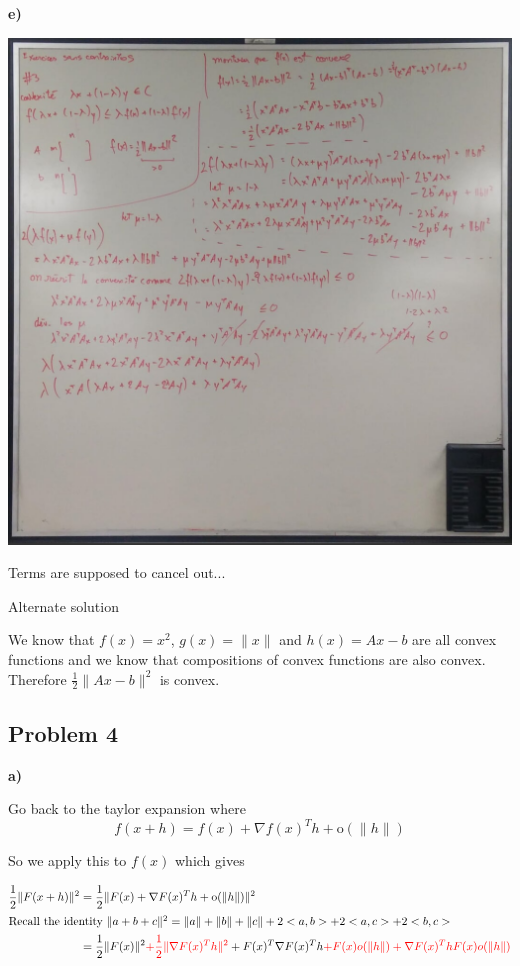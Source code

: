 \textbf{e)}

\answer
\begin{center}
\includegraphics[width=0.75\linewidth]{fig/unconstrained_exercices/pb3_e.png}
\end{center}

Terms are supposed to cancel out... 

\incomplete

\color{red}
Alternate solution

We know that $f(x) = x^2$, $g(x) = \|x\|$ and $h(x) = Ax-b$ are all convex functions and we know that compositions of convex functions are also convex. Therefore $\frac{1}{2} \| Ax-b\|^2$ is convex.

\color{black}

\subsection{Problem 4}

\textbf{a)}

\answer

Go back to the taylor expansion where
\[
	f(x+h) = f(x) + \nabla f(x)^Th + \text{o}(\| h\|)
\]

So we apply this to $f(x)$ which gives

\begin{align*}
	\frac{1}{2} \| F(x+h) \|^2 &= \frac{1}{2} \| F(x) + \nabla F(x)^Th + \text{o}(\| h\|) \|^2 \\
\intertext{Recall the identity $\| a + b + c\|^2 = \|a\| + \|b\| + \|c\| + 2<a,b> + 2<a,c> + 2<b,c>$}
	&= \frac{1}{2} \|  F(x)\|^2 \textcolor{red}{+ \frac{1}{2} \|  \nabla F(x)^Th\|^2}
		+ F(x)^T \nabla F(x)^Th \textcolor{red}{+ F(x)o(\|h\|) + \nabla F(x)^ThF(x)o(\|h\|)}
\end{align*}


